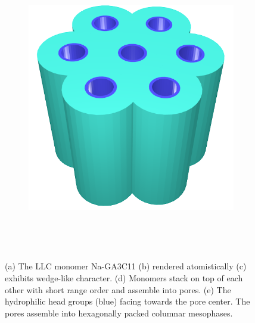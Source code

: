 \documentclass[journal=jpcbfk,manuscript=article]{achemso}
\begin{document}
\begin{figure}
\begin{subfigure}{0.4\linewidth}
		\caption{}~\label{fig:wedge_layer}
	\end{subfigure}
	\begin{subfigure}{0.4\linewidth}
		\centering
		\includegraphics[width=\textwidth]{hexagonal_packing.png}
		\caption{}~\label{fig:hex_packing_simple}
	\end{subfigure}
	\caption{(a) The LLC monomer Na-GA3C11 (b) rendered atomistically (c)
	exhibits wedge-like character. (d) Monomers stack on top of each other with
	short range order and assemble into pores. (e) The hydrophilic head groups 
	(blue) facing towards the pore center. The pores assemble into hexagonally
	packed columnar mesophases.}~\label{fig:assembly}
  \end{figure}
\end{document}

